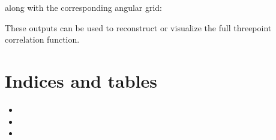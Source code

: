 \documentclass[letterpaper,10pt,english]{sphinxmanual}
\begin{document}
\begin{sphinxVerbatim}[commandchars=\\\{\}]
\end{sphinxVerbatim}

\sphinxAtStartPar
along with the corresponding angular grid:

\begin{sphinxVerbatim}[commandchars=\\\{\}]
\end{sphinxVerbatim}

\sphinxAtStartPar
These outputs can be used to reconstruct or visualize the full three\sphinxhyphen{}point correlation function.


\chapter{Indices and tables}
\label{\detokenize{index:indices-and-tables}}\begin{itemize}
\item {} 
\sphinxAtStartPar
{}

\item {} 
\sphinxAtStartPar
{}

\item {} 
\sphinxAtStartPar
{}

\end{itemize}



\renewcommand{\indexname}{Index}
\printindex
\end{document}
